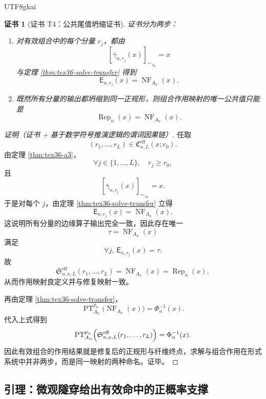 \documentclass[12pt]{article}
\newtheorem{Certificate}{证书}[section]
\newcommand{\PT}{\operatorname{PT}}
\newcommand{\NF}{\operatorname{NF}}
\begin{document}
\begin{CJK*}{UTF8}{gkai}
\begin{Certificate}[证书 T4：公共尾值坍缩证书]
\label{cert:tex36-t4}
证书分为两步：
\begin{enumerate}
  \item 对有效组合中的每个分量 $r_j$，都由
  \[
    [\bar{\gamma}_{n,r_j}(x)]_{\sim_{A_n}}=x
  \]
  与定理 \ref{thm:tex36-solve-transfer} 得到
  \[
    \mathsf E_{n,r_j}(x)=\NF_{A_n}(x).
  \]
  \item 既然所有分量的输出都坍缩到同一正规形，则组合作用映射的唯一公共值只能是
  \[
    \operatorname{Rep}_n(x)=\NF_{A_n}(x).
  \]
\end{enumerate}
\end{Certificate}

\begin{proof}[证明（证书 + 基于数学符号推演逻辑的谓词因果链）]
任取
\[
  (r_1,\ldots,r_L)\in \mathfrak C_{n,L}^{\mathrm{eff}}(x;r_0).
\]
由定理 \ref{thm:tex36-a3}，
\[
  \forall j\in\{1,\ldots,L\},\quad r_j\ge r_0,
\]
且
\[
  [\bar{\gamma}_{n,r_j}(x)]_{\sim_{A_n}}=x.
\]
于是对每个 $j$，由定理 \ref{thm:tex36-solve-transfer} 立得
\[
  \mathsf E_{n,r_j}(x)=\NF_{A_n}(x).
\]
这说明所有分量的边缘算子输出完全一致，因此存在唯一
\[
  \tau=\NF_{A_n}(x)
\]
满足
\[
  \forall j,\ \mathsf E_{n,r_j}(x)=\tau.
\]
故
\[
  \mathfrak S_{n,x,L}^{\mathrm{eff}}(r_1,\ldots,r_L)
  =
  \NF_{A_n}(x)
  =
  \operatorname{Rep}_n(x),
\]
从而作用映射良定义并与修复映射一致。

再由定理 \ref{thm:tex36-solve-transfer}，
\[
  \PT_{A_n}^{p_n}\bigl(\NF_{A_n}(x)\bigr)=\Phi_n^{-1}(x).
\]
代入上式得到
\[
  \PT_{A_n}^{p_n}\Bigl(
    \mathfrak S_{n,x,L}^{\mathrm{eff}}(r_1,\ldots,r_L)
  \Bigr)
  =
  \Phi_n^{-1}(x).
\]
因此有效组合的作用结果就是修复后的正规形与纤维终点，求解与组合作用在形式系统中并非两步，而是同一映射的两种命名。证毕。
\end{proof}

\subsection{引理：微观隧穿给出有效命中的正概率支撑}
\label{subsec:tex36-tunneling-positive-support}


\end{CJK*}
\end{document}
